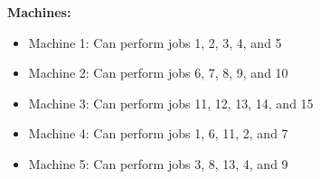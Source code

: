 {%
%
%
%
%
%

\textbf{Machines:}
\begin{itemize}
    \item Machine 1: Can perform jobs 1, 2, 3, 4, and 5
    \item Machine 2: Can perform jobs 6, 7, 8, 9, and 10
    \item Machine 3: Can perform jobs 11, 12, 13, 14, and 15
    \item Machine 4: Can perform jobs 1, 6, 11, 2, and 7
    \item Machine 5: Can perform jobs 3, 8, 13, 4, and 9
\end{itemize}

}
